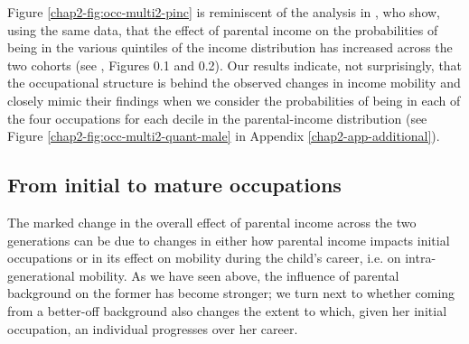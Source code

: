 Figure \ref{chap2-fig:occ-multi2-pinc} is reminiscent of the analysis in \cite{Major2018Social}, who show, using the same data, that the effect of parental income on the probabilities of being in the various quintiles of the income distribution has increased across the two cohorts (see \cite{Major2018Social}, Figures 0.1 and 0.2). Our results indicate, not surprisingly, that the occupational structure is behind the observed changes in income mobility and closely mimic their findings when we consider the probabilities of being in each of the four occupations for each decile in the parental-income distribution (see Figure \ref{chap2-fig:occ-multi2-quant-male} in Appendix \ref{chap2-app-additional}).


\subsection{From initial to mature occupations} \label{chap2-intra}

The marked change in the overall effect of parental income across the two generations can be due to changes in either how parental income impacts initial occupations or in its effect on mobility during the child's career, i.e. on intra-generational mobility. As we have seen above, the influence of parental background on the former has become stronger; we turn next to whether coming from a better-off background also changes the extent to which, given her initial occupation, an individual progresses over her career.

